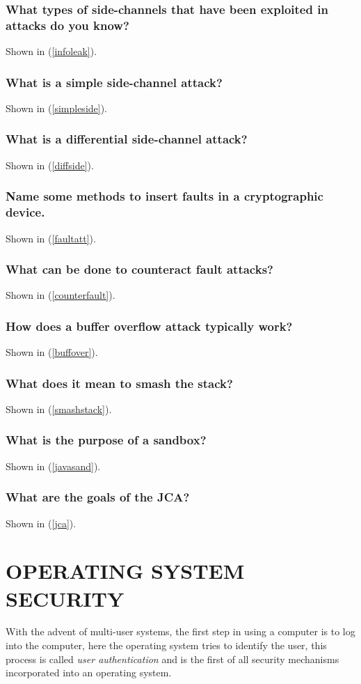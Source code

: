 \documentclass[a4paper, 10 pt, conference]{ieeeconf}
\begin{document}
\subsubsection{\textbf{What types of side-channels that have been exploited in attacks do you know?}}
Shown in (\ref{infoleak}).
\subsubsection{\textbf{What is a simple side-channel attack?}}
Shown in (\ref{simpleside}).
\subsubsection{\textbf{What is a differential side-channel attack?}}
Shown in (\ref{diffside}).
\subsubsection{\textbf{Name some methods to insert faults in a cryptographic device.}}
Shown in (\ref{faultatt}).
\subsubsection{\textbf{What can be done to counteract fault attacks?}}
Shown in (\ref{counterfault}).
\subsubsection{\textbf{How does a buffer overflow attack typically work?}}
Shown in (\ref{buffover}).
\subsubsection{\textbf{What does it mean to smash the stack?}}
Shown in (\ref{smashstack}).
\subsubsection{\textbf{What is the purpose of a sandbox?}}
Shown in (\ref{javasand}).
\subsubsection{\textbf{What are the goals of the JCA?}}
Shown in (\ref{jca}). 

\pagebreak


\section{\textbf{OPERATING SYSTEM SECURITY}}
With the advent of multi-user systems, the first step in using a computer is to log into the computer, here the operating system tries to identify the user, this process is called \emph{user authentication} and is the first of all security mechanisms incorporated into an operating system.
\end{document}
